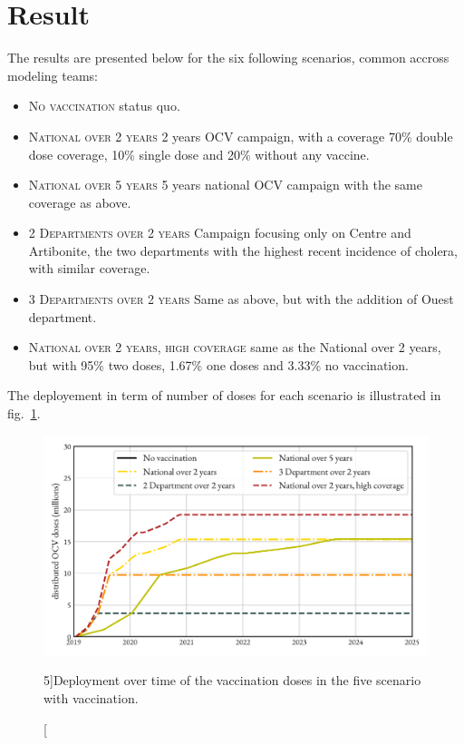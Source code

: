 \section{Result}

The results are presented below for the six following scenarios, common accross modeling teams:
\begin{itemize}
	\item \textsc{No vaccination} status quo.
	\item \textsc{National over 2 years} 2 years OCV campaign, with a coverage 70\% double dose coverage, 10\% single dose and 20\% without any vaccine.
	\item 	 \textsc{National over 5 years} 5 years national OCV campaign with the same coverage as above.
	\item \textsc{2 Departments over 2 years} Campaign focusing only on Centre and Artibonite, the two departments with the highest recent incidence of cholera, with similar coverage.
	\item \textsc{3 Departments over 2 years} Same as above, but with the addition of Ouest department.
	\item \textsc{National over 2 years, high coverage} same as the National over 2 years, but with 95\% two doses, 1.67\% one doses and 3.33\% no vaccination.
\end{itemize}
The deployement in term of number of doses for each scenario is illustrated in fig.~\ref{fig:deploy}.

\begin{figure}
\begin{center}
\includegraphics{fig_cholera-haiti-ocv/haiti-deploy.pdf}
\caption[Deployment the vaccination doses in the scenarios.][5\baselineskip]{Deployment over time of the vaccination doses in the five scenario with vaccination.}\label{fig:deploy}
\end{center}
\end{figure}

